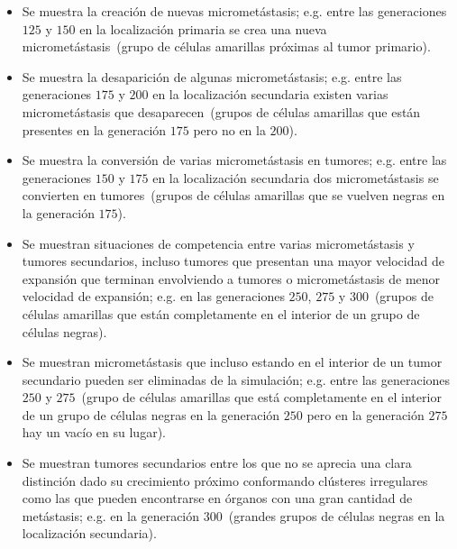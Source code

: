 \begin{itemize}
\item Se muestra la creaci\'on de nuevas micromet\'astasis; e.g. entre las generaciones $125$ y $150$ en la localizaci\'on primaria se crea una nueva micromet\'astasis~(grupo de c\'elulas amarillas pr\'oximas al tumor primario).

\item Se muestra la desaparici\'on de algunas micromet\'astasis; e.g. entre las generaciones $175$ y $200$ en la localizaci\'on secundaria existen varias micromet\'astasis que desaparecen~(grupos de c\'elulas amarillas que est\'an presentes en la generaci\'on $175$ pero no en la $200$). 

\item Se muestra la conversi\'on de varias micromet\'astasis en tumores; e.g. entre las generaciones $150$ y $175$ en la localizaci\'on secundaria dos micromet\'astasis se convierten en tumores~(grupos de c\'elulas amarillas que se vuelven negras en la generaci\'on $175$).

\item Se muestran situaciones de competencia entre varias micromet\'astasis y tumores secundarios, incluso tumores que presentan una mayor velocidad de expansi\'on que terminan envolviendo a tumores o micromet\'astasis de menor velocidad de expansi\'on; e.g. en las generaciones $250$, $275$ y $300$~(grupos de c\'elulas amarillas que est\'an completamente en el interior de un grupo de c\'elulas negras).

\item Se muestran micromet\'astasis que incluso estando en el interior de un tumor secundario pueden ser eliminadas de la simulaci\'on; e.g. entre las generaciones $250$ y $275$~(grupo de c\'elulas amarillas que est\'a completamente en el interior de un grupo de c\'elulas negras en la generaci\'on $250$ pero en la generaci\'on $275$ hay un vac\'io en su lugar).

\item Se muestran tumores secundarios entre los que no se aprecia una clara distinci\'on dado su crecimiento pr\'oximo conformando cl\'usteres irregulares como las que pueden encontrarse en \'organos con una gran cantidad de met\'astasis; e.g. en la generaci\'on $300$~(grandes grupos de c\'elulas negras en la localizaci\'on secundaria).
\end{itemize}

